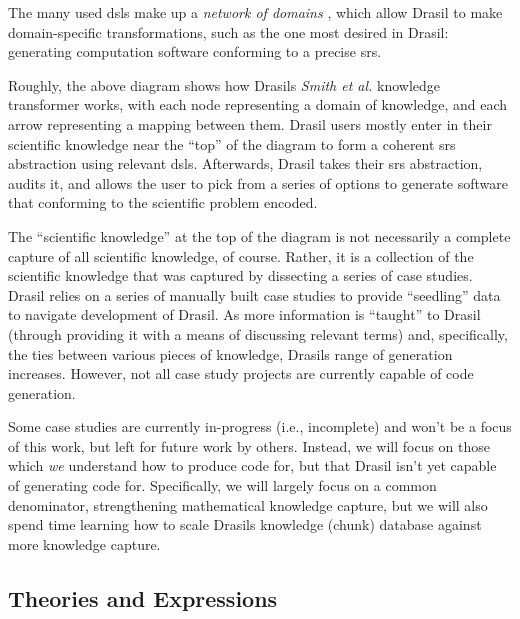 
The many used \acsp{dsl} make up a \textit{network of domains}
\cite{Czarnecki2005}, which allow Drasil to make domain-specific
transformations, such as the one most desired in Drasil: generating computation
software conforming to a precise \acs{srs}.

\roughNetworkOfDomainsIntro{}

Roughly, the above diagram shows how Drasils \textit{Smith et al.} knowledge
transformer works, with each node representing a domain of knowledge, and each
arrow representing a mapping between them. Drasil users mostly enter in their
scientific knowledge near the ``top'' of the diagram to form a coherent
\acs{srs} abstraction using relevant \acsp{dsl}. Afterwards, Drasil takes their
\acs{srs} abstraction, audits it, and allows the user to pick from a series of
options to generate software that conforming to the scientific problem encoded.

The ``scientific knowledge'' at the top of the diagram is not necessarily a
complete capture of all scientific knowledge, of course. Rather, it is a
collection of the scientific knowledge that was captured by dissecting a series
of case studies. Drasil relies on a series of manually built case studies to
provide ``seedling'' data to navigate development of Drasil. As more information
is ``taught'' to Drasil (through providing it with a means of discussing
relevant terms) and, specifically, the ties between various pieces of knowledge,
Drasils range of generation increases. However, not all case study projects are
currently capable of code generation.

Some case studies are currently in-progress (i.e., incomplete) and won't be a
focus of this work, but left for future work by others. Instead, we will focus
on those which \textit{we} understand how to produce code for, but that Drasil
isn't yet capable of generating code for. Specifically, we will largely focus on
a common denominator, strengthening mathematical knowledge capture, but we will
also spend time learning how to scale Drasils knowledge (chunk) database against
more knowledge capture.

\subsection{Theories and Expressions}


